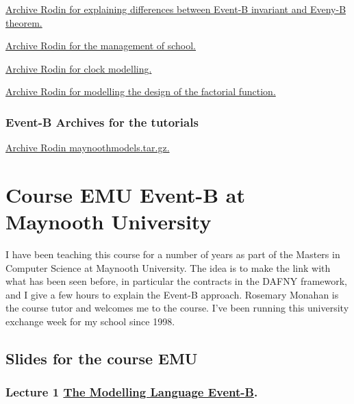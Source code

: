 \documentclass[ 12pt]{article}
\begin{document}
 \href{http://mery54.github.io/teaching/mosos/lecturesnotes/
   ex-safety.zip}{Archive Rodin  for  explaining differences between
   Event-B invariant and Eveny-B theorem. }


 
 \href{http://mery54.github.io/teaching/mosos/models/
   ex-school.zip}{Archive Rodin  for   the management of school. }

 
 
 \href{http://mery54.github.io/teaching/mosos/models/clock-tut0.zip}{Archive Rodin  for  clock modelling. }

  \href{http://mery54.github.io/teaching/mosos/lecturesnotes/factorial-plugin-tutO.zip}{Archive Rodin  for   modelling  the 
   design of the factorial function.}
  


 \subsubsection{Event-B Archives for   the tutorials}
\label{sec:event-b-archives}



\href{http://mery54.github.io/teaching/mosos/models/maynoothmodels.tar.gz}{Archive
  Rodin  maynoothmodels.tar.gz.}



\hrulefill



\section{Course  EMU  Event-B  at Maynooth University}
\label{sec:course-mcfsi-at}

I have been teaching this course for a number of years as part of the
Masters in Computer Science at Maynooth University.  The idea is to
make the link with what has been seen before, in particular the
contracts in the DAFNY framework, and I give a few hours to explain
the Event-B approach.      Rosemary Monahan is the course tutor and
welcomes me to the course.   I've been running this university exchange week for my school since 1998.



\subsection{Slides for the course EMU}
\label{sec:slides}



\subsubsection{Lecture 1
  \href{http://mery54.github.io/teaching/mosos/lecturesnotes/mcfsi-maynooth-lect1.pdf}{The 
    Modelling Language Event-B}. 
}
\end{document}
